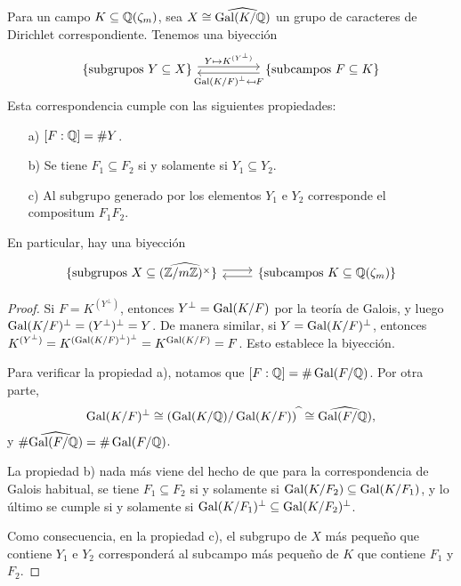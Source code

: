 \begin{teorema}
  Para un campo $K \subseteq \mathbb{Q} (\zeta_m)$, sea
  $X \cong \widehat{\operatorname{Gal} (K/\mathbb{Q})}$ un grupo de caracteres de Dirichlet
  correspondiente. Tenemos una biyección
  \[ \begin{tikzcd}[column sep=5em]
    \{ \text{subgrupos }Y \subseteq X \} \ar[shift left=0.25em]{r}{Y \mapsto K^{(Y^\perp)}} &
    \{ \text{subcampos }F \subseteq K \} \ar[shift left=0.25em]{l}{\Gal (K/F)^\perp \mapsfrom F}
  \end{tikzcd} \]
  Esta correspondencia cumple con las siguientes propiedades:
  \begin{enumerate}
  \item[a)] $[F : \mathbb{Q}] = \# Y$.

  \item[b)] Se tiene $F_1 \subseteq F_2$ si y solamente si $Y_1 \subseteq Y_2$.

  \item[c)] Al subgrupo generado por los elementos $Y_1$ e $Y_2$ corresponde
    el compositum $F_1 F_2$.
  \end{enumerate}

  En particular, hay una biyección
  \[ \begin{tikzcd}
    \{ \text{subgrupos }X \subseteq \widehat{(\ZZ/m\ZZ)^\times} \} \ar[shift left=0.25em]{r} &
    \{ \text{subcampos }K \subseteq \QQ (\zeta_m) \} \ar[shift left=0.25em]{l}
  \end{tikzcd} \]

  \begin{proof}
    Si $F = K^{(Y^\perp)}$, entonces $Y^\perp = \operatorname{Gal} (K/F)$ por la teoría de
    Galois, y luego $\operatorname{Gal} (K/F)^\perp = (Y^\perp)^\perp = Y$.
    De manera similar, si $Y = \operatorname{Gal} (K/F)^\perp$, entonces
    $K^{(Y^\perp)} = K^{(\operatorname{Gal} (K/F)^\perp)^\perp} = K^{\operatorname{Gal} (K/F)} = F$.
    Esto establece la biyección.

    Para verificar la propiedad a), notamos que $[F : \mathbb{Q}] = \# \operatorname{Gal} (F/\mathbb{Q})$.
    Por otra parte,
    \[ \operatorname{Gal} (K/F)^\perp \cong (\operatorname{Gal} (K/\mathbb{Q})/\operatorname{Gal} (K/F))^{\widehat{~}}
       \cong \widehat{\operatorname{Gal} (F/\mathbb{Q})}, \]
    y $\# \widehat{\operatorname{Gal} (F/\mathbb{Q})} = \# \operatorname{Gal} (F/\mathbb{Q})$.

    La propiedad b) nada más viene del hecho de que para la correspondencia de
    Galois habitual, se tiene $F_1 \subseteq F_2$ si y solamente si
    $\operatorname{Gal} (K/F_2) \subseteq \operatorname{Gal} (K/F_1)$, y lo último se cumple si y solamente
    si $\operatorname{Gal} (K/F_1)^\perp \subseteq \operatorname{Gal} (K/F_2)^\perp$.

    Como consecuencia, en la propiedad c), el subgrupo de $X$ más pequeño que
    contiene $Y_1$ e $Y_2$ corresponderá al subcampo más pequeño de $K$
    que contiene $F_1$ y $F_2$.
  \end{proof}
\end{teorema}

